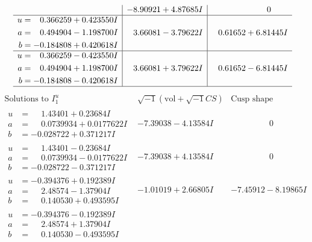 \documentclass[1p]{elsarticle_modified}
\theoremstyle{definition}
\newcommand{\I}{\sqrt{-1}}
\begin{document}
$$\begin{array}{c|c|c}
 & -8.90921 + 4.87685 I & \phantom{-0.000000 } 0 \\ \hline\begin{aligned}
u &= \phantom{-}0.366259 + 0.423550 I \\
a &= \phantom{-}0.494904 - 1.198700 I \\
b &= -0.184808 + 0.420618 I\end{aligned}
 & \phantom{-}3.66081 - 3.79622 I & \phantom{-}0.61652 + 6.81445 I \\ \hline\begin{aligned}
u &= \phantom{-}0.366259 - 0.423550 I \\
a &= \phantom{-}0.494904 + 1.198700 I \\
b &= -0.184808 - 0.420618 I\end{aligned}
 & \phantom{-}3.66081 + 3.79622 I & \phantom{-}0.61652 - 6.81445 I\\
 \hline 
 \end{array}$$\newpage$$\begin{array}{c|c|c}  
\text{Solutions to }I^u_{1}& \I (\text{vol} + \sqrt{-1}CS) & \text{Cusp shape}\\
 \hline 
\begin{aligned}
u &= \phantom{-}1.43401 + 0.23684 I \\
a &= \phantom{-}0.0739934 + 0.0177622 I \\
b &= -0.028722 + 0.371217 I\end{aligned}
 & -7.39038 - 4.13584 I & \phantom{-0.000000 } 0 \\ \hline\begin{aligned}
u &= \phantom{-}1.43401 - 0.23684 I \\
a &= \phantom{-}0.0739934 - 0.0177622 I \\
b &= -0.028722 - 0.371217 I\end{aligned}
 & -7.39038 + 4.13584 I & \phantom{-0.000000 } 0 \\ \hline\begin{aligned}
u &= -0.394376 + 0.192389 I \\
a &= \phantom{-}2.48574 - 1.37904 I \\
b &= \phantom{-}0.140530 + 0.493595 I\end{aligned}
 & -1.01019 + 2.66805 I & -7.45912 - 8.19865 I \\ \hline\begin{aligned}
u &= -0.394376 - 0.192389 I \\
a &= \phantom{-}2.48574 + 1.37904 I \\
b &= \phantom{-}0.140530 - 0.493595 I\end{aligned}

\end{array}$$
\end{document}

